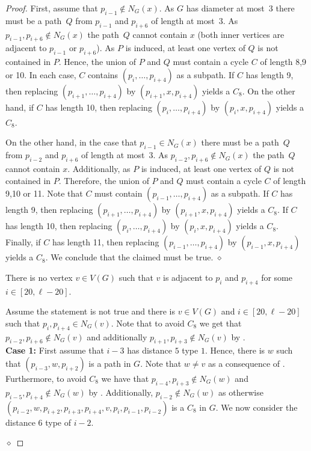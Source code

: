 \documentclass[runningheads,envcountsame]{llncs}
\newenvironment{claimproof}
{\noindent {\em Proof of Claim:} }
{\hfill $\diamond$ \smallskip}
\begin{document}
\begin{proof}
\begin{claimproof}
        First, assume that $p_{i-1}\notin N_G(x)$. 
        As $G$ has diameter at most~$3$ there must be a path~$Q$ from $p_{i-1}$ and $p_{i+6}$ of length at most~$3$. As $p_{i-1},p_{i+6}\notin N_G(x)$ the path~$Q$ cannot contain $x$ (both inner vertices are adjacent to $p_{i-1}$ or $p_{i+6}$). As $P$ is induced, at least one vertex of $Q$ is not contained in $P$. Hence, the union of $P$ and $Q$ must contain a cycle $C$ of length 8,9 or 10. In each case, $C$ contains $(p_i,\dots,p_{i+4})$ as a subpath. If $C$ has length 9, then replacing $(p_{i+1},\dots, p_{i+4})$ by $(p_{i+1},x,p_{i+4})$  yields a $C_8$. On the other hand, if $C$ has length 10, then replacing $(p_i,\dots, p_{i+4})$ by $(p_i,x,p_{i+4})$  yields a $C_8$.
        
        On the other hand, in the case that $p_{i-1}\in N_G(x)$ there must be a path~$Q$ from $p_{i-2}$ and $p_{i+6}$ of length at most~$3$. As $p_{i-2},p_{i+6}\notin N_G(x)$ the path~$Q$ cannot contain $x$. Additionally, as $P$ is induced, at least one vertex of $Q$ is not contained in $P$. Therefore, the union of $P$ and $Q$ must contain a cycle $C$ of length 9,10 or 11. Note that $C$ must contain $(p_{i-1},\dots,p_{i+4})$ as a subpath. If $C$ has length 9, then replacing $(p_{i+1},\dots, p_{i+4})$ by $(p_{i+1},x,p_{i+4})$  yields a $C_8$. If $C$ has length 10, then replacing $(p_i,\dots, p_{i+4})$ by $(p_i,x,p_{i+4})$  yields a $C_8$. Finally, if $C$ has length 11, then replacing $(p_{i-1},\dots, p_{i+4})$ by $(p_{i-1},x,p_{i+4})$ yields a $C_8$. We conclude that the claimed must be true.
    \end{claimproof}
    
    \begin{mclaim}\label{claim:case04}
        There is no vertex $v\in V(G)$ such that $v$ is adjacent to $p_i$ and $p_{i+4}$ for some $i\in [20,\ell-20]$.
    \end{mclaim}
    \begin{claimproof}
        Assume the statement is not true and there is $v\in V(G)$ and $i\in [20,\ell-20]$ such that $p_i,p_{i+4}\in N_G(v)$. Note that to avoid $C_8$ we get that $p_{i-2},p_{i+6}\notin N_G(v)$ and additionally $p_{i+1},p_{i+3}\notin N_G(v)$ by . \\

        \noindent\textbf{Case 1:} First assume that $i-3$ has distance $5$ type $1$. Hence, there is $w$ such that $(p_{i-3}, w, p_{i+2})$ is a path in $G$. Note that $w\not=v$ as a consequence of .  Furthermore, to avoid $C_8$ we have that $p_{i-4},p_{i+3}\notin N_G(w)$ and $p_{i-5},p_{i+4}\notin N_G(w)$ by . Additionally, $p_{i-2}\notin N_G(w)$ as otherwise $(p_{i-2},w,p_{i+2}, p_{i+3},p_{i+4},v,p_{i}, p_{i-1},p_{i-2})$ is a $C_8$ in $G$.
        We now consider the distance $6$ type of $i-2$.


\end{claimproof}
\end{proof}
\end{document}

